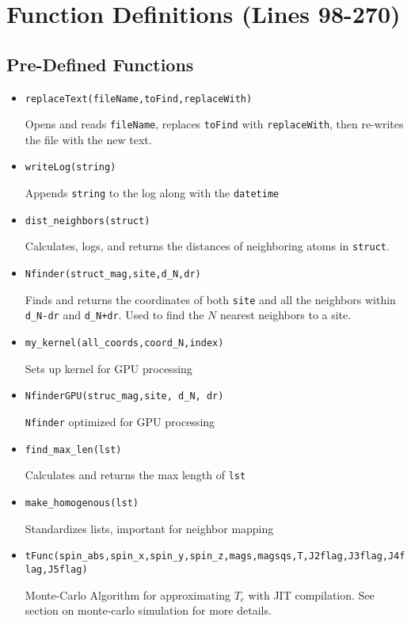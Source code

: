 \documentclass[12pt]{article}
\begin{document}
\section*{Function Definitions (Lines 98-270)}
\subsection*{Pre-Defined Functions}
\begin{itemize}
    \item \texttt{replaceText(fileName,toFind,replaceWith)} 
    
    
    Opens and reads \texttt{fileName}, replaces \texttt{toFind} with \texttt{replaceWith}, then re-writes the file with the new text. 
    
    \item \texttt{writeLog(string)} 
    
    Appends \texttt{string} to the log along with the \texttt{datetime}
    
    \item \texttt{dist_neighbors(struct)}
    
    Calculates, logs, and returns the distances of neighboring atoms in \texttt{struct}. 
    
    \item \texttt{Nfinder(struct_mag,site,d_N,dr)}
    
    Finds and returns the coordinates of both \texttt{site} and all the neighbors within \texttt{d_N-dr} and \texttt{d_N+dr}. Used to find the $N$ nearest neighbors to a site. 
    
    \item \texttt{my_kernel(all_coords,coord_N,index)}
    
    Sets up kernel for GPU processing
    
    \item \texttt{NfinderGPU(struc_mag,site, d_N, dr)}
    
    \texttt{Nfinder} optimized for GPU processing
    
    \item \texttt{find_max_len(lst)}
    
    Calculates and returns the max length of \texttt{lst}
    
    \item \texttt{make_homogenous(lst)}
    
    Standardizes lists, important for neighbor mapping
    \item \texttt{tFunc(spin_abs,spin_x,spin_y,spin_z,mags,magsqs,T,J2flag,J3flag,J4flag,J5flag)}
    
    Monte-Carlo Algorithm for approximating $T_c$ with JIT compilation. See section on monte-carlo simulation for more details. 
\end{itemize}
\end{document}
